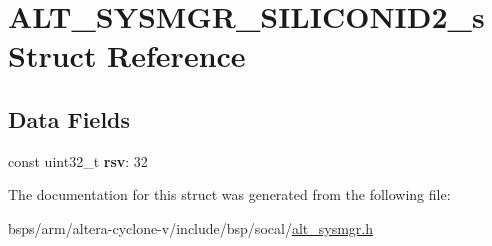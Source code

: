\hypertarget{structALT__SYSMGR__SILICONID2__s}{}\section{A\+L\+T\+\_\+\+S\+Y\+S\+M\+G\+R\+\_\+\+S\+I\+L\+I\+C\+O\+N\+I\+D2\+\_\+s Struct Reference}
\label{structALT__SYSMGR__SILICONID2__s}
\subsection*{Data Fields}
\begin{DoxyCompactItemize}
\item 
\mbox{\label{structALT__SYSMGR__SILICONID2__s_a2ed1e07b05ae019979ea06247b39c275}} 
const uint32\+\_\+t {\bfseries rsv}\+: 32
\end{DoxyCompactItemize}


The documentation for this struct was generated from the following file\+:\begin{DoxyCompactItemize}
\item 
bsps/arm/altera-\/cyclone-\/v/include/bsp/socal/\mbox{\hyperlink{alt__sysmgr_8h}{alt\+\_\+sysmgr.\+h}}\end{DoxyCompactItemize}
